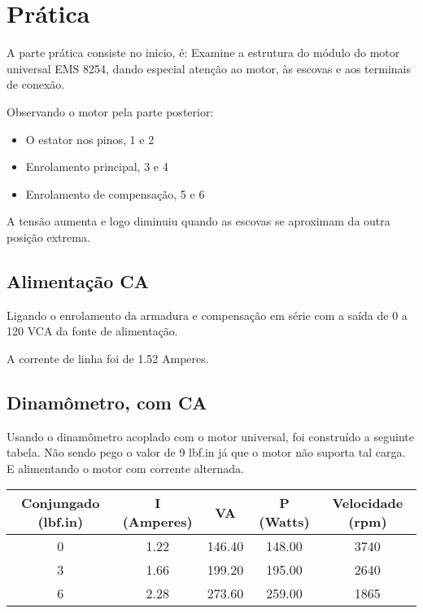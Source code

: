 \documentclass[paper=a4, fontsize=11pt]{article}
\begin{document}
\section{Prática}

A parte prática consiste no inicio, é: Examine a estrutura do módulo
do motor universal EMS 8254, dando especial atenção ao motor, às escovas
e aos terminais de conexão. 

Observando o motor pela parte posterior:

\begin{itemize}
    \item O estator nos pinos, 1 e 2
    \item Enrolamento principal, 3 e 4
    \item Enrolamento de compensação, 5 e 6
\end{itemize}

A tensão aumenta e logo diminuiu quando as escovas se aproximam 
da outra posição extrema.

\subsection{Alimentação CA}

Ligando o enrolamento da armadura e compensação em série com
a saída de 0 a 120 VCA da fonte de alimentação. 

A corrente de linha foi de 1.52 Amperes.

\subsection{Dinamômetro, com CA}

Usando o dinamômetro acoplado com o motor universal, foi construído 
a seguinte tabela. Não sendo pego o valor de 9 lbf.in já que o 
motor não suporta tal carga. E alimentando o motor com corrente 
alternada.

\begin{center}
    \begin{tabular}{c|c|c|c|c}
            Conjungado (lbf.in) & I (Amperes) & VA & P (Watts) & Velocidade (rpm) \\
            \hline
            0 & 1.22 & 146.40 & 148.00 & 3740 \\
            3 & 1.66 & 199.20 & 195.00 & 2640 \\
            6 & 2.28 & 273.60 & 259.00 & 1865 \\
    \end{tabular}
\end{center}
\end{document}
